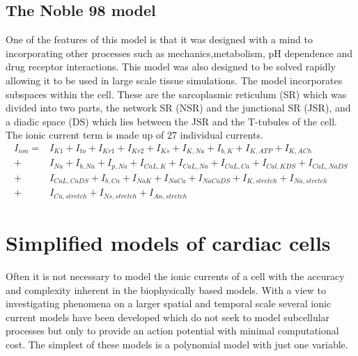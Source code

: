 \subsection{The Noble 98 model}
\label{sec:The_Noble_98_model}
One of the features of this model is that it
was designed with a mind to incorporating other processes such as
mechanics,metabolism, pH dependence and drug receptor interactions. This model was also
designed to be solved rapidly allowing it to be used in large scale tissue simulations.
The model incorporates subspaces within the cell. These are the sarcoplasmic
reticulum (SR) which was divided into two parts, the network SR (NSR) and the
junctional SR (JSR), and a diadic space (DS) which lies between the JSR and
the T-tubules of the cell.
The ionic current term is made up of $27$ individual currents.
\begin{align}
  I_{ion}=&I_{K1}+I_{to}+I_{Kr1}+I_{Kr2}+I_{Ks}+I_{K,Na}+I_{b,K}+I_{K,ATP}+I_{K,ACh} \nonumber \\ 
         +&I_{Na}+I_{b,Na}+I_{p,Na}+I_{CaL,K}+I_{CaL,Na}+I_{CaL,Ca}+I_{Cal,KDS}+I_{CaL,NaDS}\nonumber \\ 
         +&I_{CaL,CaDS}+I_{b,Ca}+I_{NaK}+I_{NaCa}+I_{NaCaDS}+I_{K,stretch}+I_{Na,stretch} \nonumber \\
         +&I_{Ca,stretch}+I_{Ns,stretch}+I_{An,stretch}
\end{align}
%
%
\section{Simplified models of cardiac cells}
\label{sec:Simplified_models_of_cardiac_cells}
Often it is not necessary to model the ionic currents of a cell with the
accuracy and complexity inherent in the biophysically based models. With a view
to investigating phenomena on a larger spatial and temporal scale several
ionic current models have been developed which do not seek to model
subcellular processes but only to provide an action potential with minimal
computational cost. The simplest of these models is a polynomial model with
just one variable.
%
